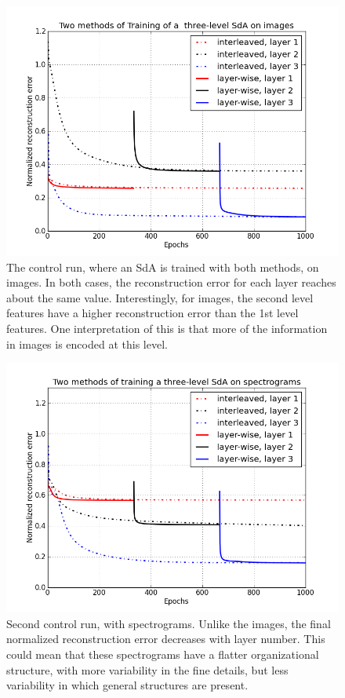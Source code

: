 \documentclass[12pt]{article}
\begin{document}
\begin{doublespacing}
\begin{figure}[p]
\centering
\includegraphics[width=6in]{graph_image_only}
\caption{The control run, where an SdA is trained with both methods, on images. In both cases, the reconstruction error for each layer reaches about the same value. Interestingly, for images, the second level features have a higher reconstruction error than the 1st level features. One interpretation of this is that more of the information in images is encoded at this level.}
\label{fig:graph_image_only}
\end{figure}

\begin{figure}[p]
\centering
\includegraphics[width=6in]{graph_spect_only}
\caption{Second control run, with spectrograms. Unlike the images, the final normalized reconstruction error decreases with layer number. This could mean that these spectrograms have a flatter organizational structure, with more variability in the fine details, but less variability in which general structures are present.}
\label{fig:graph_spect_only}
\end{figure}


\end{doublespacing}
\end{document}
